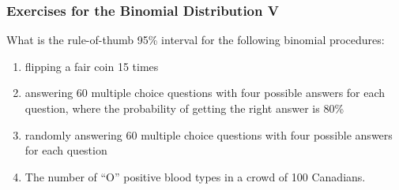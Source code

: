 \documentclass[xcolor=dvipsnames]{beamer}
\begin{document}
\begin{frame}
  \frametitle{Exercises for the Binomial Distribution V}
  {\ubung} What is the rule-of-thumb 95\% interval for the following
  binomial procedures:
  \begin{enumerate}
\item<1-> flipping a fair coin 15 times
\item<2-> answering 60 multiple choice questions with four possible
  answers for each question, where the probability of getting the right answer is 80\%
\item<3-> randomly answering 60 multiple choice questions with four
  possible answers for each question
\item<4-> The number of ``O'' positive blood types in a crowd of 100 Canadians.
  \end{enumerate}
\end{frame}


\end{document}
